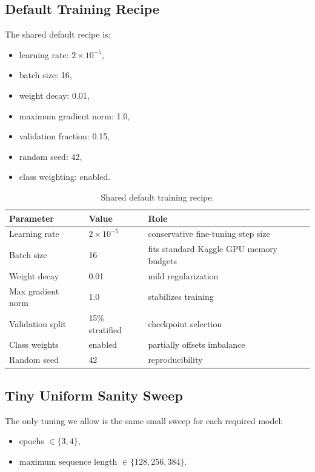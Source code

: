 \documentclass[12pt]{fphw}
\begin{document}
\subsection{Default Training Recipe}

The shared default recipe is:
\begin{itemize}
	\item learning rate: $2 \times 10^{-5}$,
	\item batch size: 16,
	\item weight decay: 0.01,
	\item maximum gradient norm: 1.0,
	\item validation fraction: 0.15,
	\item random seed: 42,
	\item class weighting: enabled.
\end{itemize}

\begin{table}[h]
\centering
\small
\begin{tabularx}{\textwidth}{Xll}
\toprule
Parameter & Value & Role \\
\midrule
Learning rate & $2 \times 10^{-5}$ & conservative fine-tuning step size \\
Batch size & 16 & fits standard Kaggle GPU memory budgets \\
Weight decay & 0.01 & mild regularization \\
Max gradient norm & 1.0 & stabilizes training \\
Validation split & 15\% stratified & checkpoint selection \\
Class weights & enabled & partially offsets imbalance \\
Random seed & 42 & reproducibility \\
\bottomrule
\end{tabularx}
\caption{Shared default training recipe.}
\label{tab:default-recipe}
\end{table}

\subsection{Tiny Uniform Sanity Sweep}

The only tuning we allow is the same small sweep for each required model:
\begin{itemize}
	\item epochs $\in \{3, 4\}$,
	\item maximum sequence length $\in \{128, 256, 384\}$.
\end{itemize}
\end{document}
